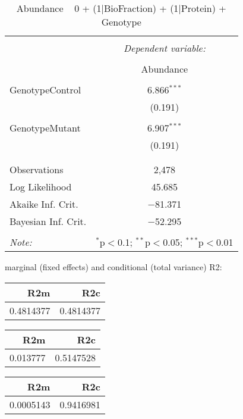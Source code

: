 \documentclass[11pt]{report}
\begin{document}
\begin{table}[!htbp] \centering 
  \caption{Abundance ~ 0 + (1|BioFraction) + (1|Protein) + Genotype} 
  \label{} 
\begin{tabular}{@{\extracolsep{5pt}}lc} 
\\[-1.8ex]\hline 
\hline \\[-1.8ex] 
 & \multicolumn{1}{c}{\textit{Dependent variable:}} \\ 
\cline{2-2} 
\\[-1.8ex] & Abundance \\ 
\hline \\[-1.8ex] 
 GenotypeControl & 6.866$^{***}$ \\ 
  & (0.191) \\ 
  & \\ 
 GenotypeMutant & 6.907$^{***}$ \\ 
  & (0.191) \\ 
  & \\ 
\hline \\[-1.8ex] 
Observations & 2,478 \\ 
Log Likelihood & 45.685 \\ 
Akaike Inf. Crit. & $-$81.371 \\ 
Bayesian Inf. Crit. & $-$52.295 \\ 
\hline 
\hline \\[-1.8ex] 
\textit{Note:}  & \multicolumn{1}{r}{$^{*}$p$<$0.1; $^{**}$p$<$0.05; $^{***}$p$<$0.01} \\ 
\end{tabular} 
\end{table} 
marginal (fixed effects) and conditional (total variance) R2:

\begin{tabular}{r|r}
\hline
R2m & R2c\\
\hline
0.4814377 & 0.4814377\\
\hline
\end{tabular}

\begin{tabular}{r|r}
\hline
R2m & R2c\\
\hline
0.013777 & 0.5147528\\
\hline
\end{tabular}

\begin{tabular}{r|r}
\hline
R2m & R2c\\
\hline
0.0005143 & 0.9416981\\
\hline
\end{tabular}
\end{document}
